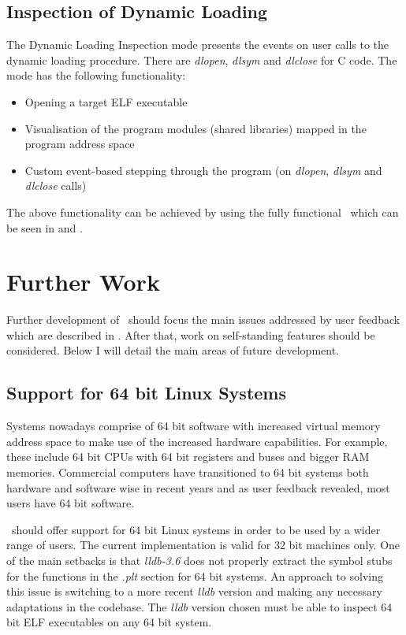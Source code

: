 \subsection{Inspection of Dynamic Loading}
\label{sub-sec:dynload-curr-sts}

The Dynamic Loading Inspection mode presents the events on user calls to the dynamic loading procedure. There are \textit{dlopen}, \textit{dlsym} and \textit{dlclose} for C code. The mode has the following functionality:
\begin{itemize}
\item Opening a target ELF executable
\item Visualisation of the program modules (shared libraries) mapped in the program address space
\item Custom event-based stepping through the program (on \textit{dlopen}, \textit{dlsym} and \textit{dlclose} calls)
\end{itemize}

The above functionality can be achieved by using the fully functional \gui\ which can be seen in  and .

\section{Further Work}
\label{sec:further-work}

Further development of \project\ should focus the main issues addressed by user feedback which are described in . After that, work on self-standing features should be considered. Below I will detail the main areas of future development.

\subsection{Support for 64 bit Linux Systems}
\label{sub-sec:support-64-further}

Systems nowadays comprise of 64 bit software with increased virtual memory address space to make use of the increased hardware capabilities. For example, these include 64 bit CPUs with 64 bit registers and buses and bigger RAM memories. Commercial computers have transitioned to 64 bit systems both hardware and software wise in recent years and as user feedback revealed, most users have 64 bit software. 

\project\ should offer support for 64 bit Linux systems in order to be used by a wider range of users. The current implementation is valid for 32 bit machines only. One of the main setbacks is that \textit{lldb-3.6} does not properly extract the symbol stubs for the functions in the \textit{.plt} section for 64 bit systems. An approach to solving this issue is switching to a more recent \textit{lldb} version and making any necessary adaptations in the codebase. The \textit{lldb} version chosen must be able to inspect 64 bit ELF executables on any 64 bit system. 

